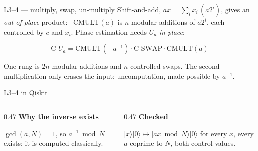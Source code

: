 \documentclass[aspectratio=169,11pt]{beamer}
\newcommand{\blocktitle}[1]{{\bfseries #1}\par\vskip1mm}
\newcommand{\code}[2][]{}
\newcommand{\bundle}[3]{\draw[thick,color=body] (#1-0.07,#2-0.13) -- (#1+0.07,#2+0.13);
  \node[font=\tiny,color=subtle,above right=-1pt] at (#1,#2) {#3};}
\begin{document}
\begin{frame}{L3--4 --- multiply, swap, un-multiply}
  Shift-and-add, $ax=\sum_i x_i\,(a2^i)$, gives an \emph{out-of-place} product: \ $\mathrm{CMULT}(a)$ is $n$ modular additions of $a2^i$, each controlled by $c$ and $x_i$. Phase estimation needs $U_a$ \emph{in place}:
  \vskip2mm
  \centering
  \vskip1mm
  \raggedright
  \[ \text{C-}U_a=\mathrm{CMULT}(-a^{-1})\cdot\text{C-SWAP}\cdot\mathrm{CMULT}(a) \]
  \begin{takeaway}One rung is $2n$ modular additions and $n$ controlled swaps. The second multiplication only erases the input: uncomputation, made possible by $a^{-1}$.\end{takeaway}
\end{frame}

\begin{frame}[fragile]{L3--4 in Qiskit}
  \code[basicstyle=\ttfamily\footnotesize]{c_ua.py}
  \vskip2mm
  \begin{columns}[T]
    \begin{column}{0.47\textwidth}
      \blocktitle{Why the inverse exists}
      $\gcd(a,N)=1$, so $a^{-1}\bmod N$ exists; it is computed classically.
    \end{column}
    \begin{column}{0.47\textwidth}
      \blocktitle{Checked}
      $|x\rangle|0\rangle\mapsto|ax \bmod N\rangle|0\rangle$ for every $x$, every $a$ coprime to $N$, both control values.
    \end{column}
  \end{columns}
\end{frame}
\end{document}
